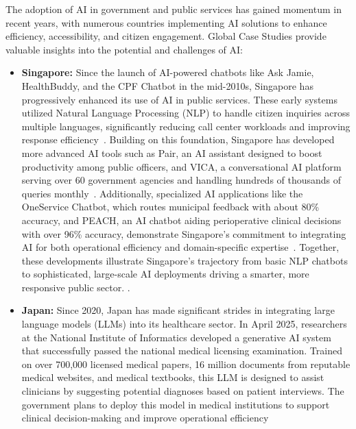 \documentclass[12pt]{report}
\begin{document}
The adoption of AI in government and public services has gained momentum in recent years, with numerous countries implementing AI solutions to enhance efficiency, accessibility, and citizen engagement. 
Global Case Studies provide valuable insights into the potential and challenges of AI:
\begin{itemize}
    \item \textbf{Singapore:} Since the launch of AI-powered chatbots like Ask Jamie, HealthBuddy, and the CPF Chatbot in the mid-2010s, Singapore has progressively enhanced its use of AI in public services. These early systems utilized Natural Language Processing (NLP) to handle citizen inquiries across multiple languages, significantly reducing call center workloads and improving response efficiency~\cite{govtech2016askjamie}. Building on this foundation, Singapore has developed more advanced AI tools such as Pair, an AI assistant designed to boost productivity among public officers, and VICA, a conversational AI platform serving over 60 government agencies and handling hundreds of thousands of queries monthly~\cite{govtech2025pair}. Additionally, specialized AI applications like the OneService Chatbot, which routes municipal feedback with about 80\% accuracy, and PEACH, an AI chatbot aiding perioperative clinical decisions with over 96\% accuracy, demonstrate Singapore's commitment to integrating AI for both operational efficiency and domain-specific expertise~\cite{chong2024peach}. Together, these developments illustrate Singapore's trajectory from basic NLP chatbots to sophisticated, large-scale AI deployments driving a smarter, more responsive public sector. \cite{govsgvica2025}.
    \item \textbf{Japan:} Since 2020, Japan has made significant strides in integrating large language models (LLMs) into its healthcare sector. In April 2025, researchers at the National Institute of Informatics developed a generative AI system that successfully passed the national medical licensing examination. Trained on over 700,000 licensed medical papers, 16 million documents from reputable medical websites, and medical textbooks, this LLM is designed to assist clinicians by suggesting potential diagnoses based on patient interviews. The government plans to deploy this model in medical institutions to support clinical decision-making and improve operational efficiency~\cite{nii2025ai,crds2024rwd}

\end{itemize}
\end{document}
